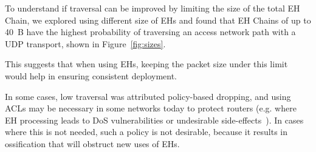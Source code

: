 \documentclass[conference]{IEEEtran}
\begin{document}


To understand if traversal can be improved by limiting the size of the total EH Chain, we explored using different size of EHs and found that EH Chains of up to 40~B have the highest probability of traversing an access network path with a UDP transport, shown in Figure~\ref{fig:sizes}.

This suggests that when using EHs, keeping the packet size under this limit would help in ensuring consistent deployment.

In some cases, low traversal was attributed policy-based dropping, and using ACLs may be necessary in some networks today to protect routers (e.g. where EH processing leads to DoS vulnerabilities or undesirable side-effects~\cite{passive-threats}). In cases where this is not needed, such a policy is not desirable, because it results in ossification that will obstruct new uses of EHs.







\end{document}
